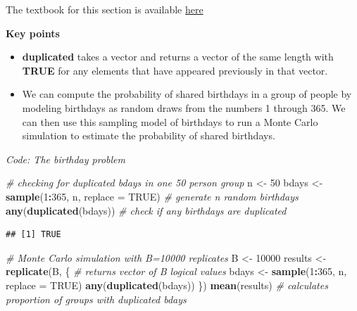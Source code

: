 \documentclass[
]{article}
\newenvironment{Shaded}{\begin{snugshade}}{\end{snugshade}}
\newcommand{\CommentTok}[1]{\textcolor[rgb]{0.56,0.35,0.01}{\textit{#1}}}
\newcommand{\DataTypeTok}[1]{\textcolor[rgb]{0.13,0.29,0.53}{#1}}
\newcommand{\DecValTok}[1]{\textcolor[rgb]{0.00,0.00,0.81}{#1}}
\newcommand{\KeywordTok}[1]{\textcolor[rgb]{0.13,0.29,0.53}{\textbf{#1}}}
\newcommand{\NormalTok}[1]{#1}
\newcommand{\OperatorTok}[1]{\textcolor[rgb]{0.81,0.36,0.00}{\textbf{#1}}}
\newcommand{\OtherTok}[1]{\textcolor[rgb]{0.56,0.35,0.01}{#1}}
\newcommand{\StringTok}[1]{\textcolor[rgb]{0.31,0.60,0.02}{#1}}
\providecommand{\tightlist}{%
  \setlength{\itemsep}{0pt}\setlength{\parskip}{0pt}}
\begin{document}
The textbook for this section is available
\href{https://rafalab.github.io/dsbook/probability.html\#birthday-problem}{here}

\textbf{Key points}

\begin{itemize}
\tightlist
\item
  \textbf{duplicated} takes a vector and returns a vector of the same
  length with \textbf{TRUE} for any elements that have appeared
  previously in that vector.
\item
  We can compute the probability of shared birthdays in a group of
  people by modeling birthdays as random draws from the numbers 1
  through 365. We can then use this sampling model of birthdays to run a
  Monte Carlo simulation to estimate the probability of shared
  birthdays.
\end{itemize}

\emph{Code: The birthday problem}

\begin{Shaded}
\begin{Highlighting}[]
\CommentTok{\# checking for duplicated bdays in one 50 person group}
\NormalTok{n \textless{}{-}}\StringTok{ }\DecValTok{50}
\NormalTok{bdays \textless{}{-}}\StringTok{ }\KeywordTok{sample}\NormalTok{(}\DecValTok{1}\OperatorTok{:}\DecValTok{365}\NormalTok{, n, }\DataTypeTok{replace =} \OtherTok{TRUE}\NormalTok{)    }\CommentTok{\# generate n random birthdays}
\KeywordTok{any}\NormalTok{(}\KeywordTok{duplicated}\NormalTok{(bdays))    }\CommentTok{\# check if any birthdays are duplicated}
\end{Highlighting}
\end{Shaded}

\begin{verbatim}
## [1] TRUE
\end{verbatim}

\begin{Shaded}
\begin{Highlighting}[]
\CommentTok{\# Monte Carlo simulation with B=10000 replicates}
\NormalTok{B \textless{}{-}}\StringTok{ }\DecValTok{10000}
\NormalTok{results \textless{}{-}}\StringTok{ }\KeywordTok{replicate}\NormalTok{(B, \{    }\CommentTok{\# returns vector of B logical values}
\NormalTok{    bdays \textless{}{-}}\StringTok{ }\KeywordTok{sample}\NormalTok{(}\DecValTok{1}\OperatorTok{:}\DecValTok{365}\NormalTok{, n, }\DataTypeTok{replace =} \OtherTok{TRUE}\NormalTok{)}
    \KeywordTok{any}\NormalTok{(}\KeywordTok{duplicated}\NormalTok{(bdays))}
\NormalTok{\})}
\KeywordTok{mean}\NormalTok{(results)    }\CommentTok{\# calculates proportion of groups with duplicated bdays}
\end{Highlighting}
\end{Shaded}
\end{document}
